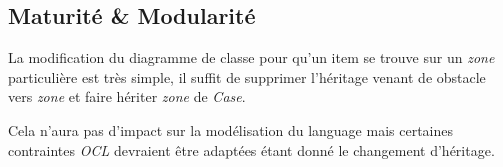 
\subsection{Maturité & Modularité}
\label{sec:question-22}

La modification du diagramme de classe pour qu'un item se trouve sur un \emph{zone} particulière est très simple, il suffit de supprimer l'héritage venant de obstacle vers \emph{zone} et 
faire hériter \emph{zone} de \emph{Case}.

Cela n'aura pas d'impact sur la modélisation du language mais certaines contraintes \emph{OCL} devraient être adaptées étant donné le changement d'héritage.